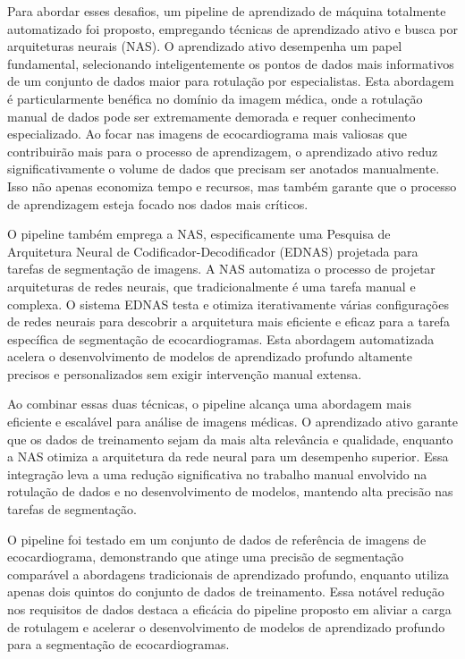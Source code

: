 Para abordar esses desafios, um pipeline de aprendizado de máquina totalmente automatizado foi proposto, empregando técnicas de aprendizado ativo e busca por arquiteturas neurais (NAS). O aprendizado ativo desempenha um papel fundamental, selecionando inteligentemente os pontos de dados mais informativos de um conjunto de dados maior para rotulação por especialistas. Esta abordagem é particularmente benéfica no domínio da imagem médica, onde a rotulação manual de dados pode ser extremamente demorada e requer conhecimento especializado. Ao focar nas imagens de ecocardiograma mais valiosas que contribuirão mais para o processo de aprendizagem, o aprendizado ativo reduz significativamente o volume de dados que precisam ser anotados manualmente. Isso não apenas economiza tempo e recursos, mas também garante que o processo de aprendizagem esteja focado nos dados mais críticos.

O pipeline também emprega a NAS, especificamente uma Pesquisa de Arquitetura Neural de Codificador-Decodificador (EDNAS) projetada para tarefas de segmentação de imagens. A NAS automatiza o processo de projetar arquiteturas de redes neurais, que tradicionalmente é uma tarefa manual e complexa. O sistema EDNAS testa e otimiza iterativamente várias configurações de redes neurais para descobrir a arquitetura mais eficiente e eficaz para a tarefa específica de segmentação de ecocardiogramas. Esta abordagem automatizada acelera o desenvolvimento de modelos de aprendizado profundo altamente precisos e personalizados sem exigir intervenção manual extensa.

Ao combinar essas duas técnicas, o pipeline alcança uma abordagem mais eficiente e escalável para análise de imagens médicas. O aprendizado ativo garante que os dados de treinamento sejam da mais alta relevância e qualidade, enquanto a NAS otimiza a arquitetura da rede neural para um desempenho superior. Essa integração leva a uma redução significativa no trabalho manual envolvido na rotulação de dados e no desenvolvimento de modelos, mantendo alta precisão nas tarefas de segmentação.

O pipeline foi testado em um conjunto de dados de referência de imagens de ecocardiograma, demonstrando que atinge uma precisão de segmentação comparável a abordagens tradicionais de aprendizado profundo, enquanto utiliza apenas dois quintos do conjunto de dados de treinamento. Essa notável redução nos requisitos de dados destaca a eficácia do pipeline proposto em aliviar a carga de rotulagem e acelerar o desenvolvimento de modelos de aprendizado profundo para a segmentação de ecocardiogramas.

